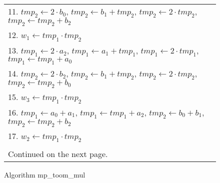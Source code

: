 \documentclass[b5paper]{book}
\begin{document}
\begin{figure}[!here]
\begin{small}
\begin{center}
\begin{tabular}{l}
11. $tmp_2 \leftarrow 2 \cdot b_0$, $tmp_2 \leftarrow b_1 + tmp_2$, $tmp_2 \leftarrow 2 \cdot tmp_2$, $tmp_2 \leftarrow tmp_2 + b_2$ \\
12. $w_1 \leftarrow tmp_1 \cdot tmp_2$ \\
13. $tmp_1 \leftarrow 2 \cdot a_2$, $tmp_1 \leftarrow a_1 + tmp_1$, $tmp_1 \leftarrow 2 \cdot tmp_1$, $tmp_1 \leftarrow tmp_1 + a_0$ \\
14. $tmp_2 \leftarrow 2 \cdot b_2$, $tmp_2 \leftarrow b_1 + tmp_2$, $tmp_2 \leftarrow 2 \cdot tmp_2$, $tmp_2 \leftarrow tmp_2 + b_0$ \\
15. $w_3 \leftarrow tmp_1 \cdot tmp_2$ \\
16. $tmp_1 \leftarrow a_0 + a_1$, $tmp_1 \leftarrow tmp_1 + a_2$, $tmp_2 \leftarrow b_0 + b_1$, $tmp_2 \leftarrow tmp_2 + b_2$ \\
17. $w_2 \leftarrow tmp_1 \cdot tmp_2$ \\
\\
Continued on the next page.\\
\hline
\end{tabular}
\end{center}
\end{small}
\caption{Algorithm mp\_toom\_mul}
\end{figure}
\end{document}
